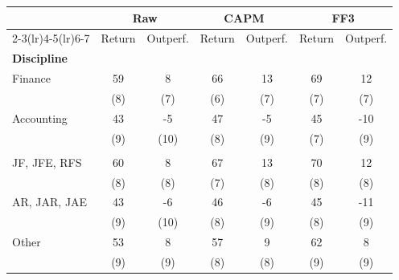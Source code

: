 \begin{tabular}{lcccccc}
   \toprule
   & \multicolumn{2}{c}{Raw} & \multicolumn{2}{c}{CAPM} & \multicolumn{2}{c}{FF3} \\
   \cmidrule(lr){2-3}\cmidrule(lr){4-5}\cmidrule(lr){6-7}
   & Return & Outperf. & Return & Outperf. & Return & Outperf. \\
   \midrule
   \multicolumn{7}{l}{\textbf{Discipline}} \\
   Finance & 59 & 8 & 66 & 13 & 69 & 12 \\
   & (8) & (7) & (6) & (7) & (7) & (7) \\
   Accounting & 43 & -5 & 47 & -5 & 45 & -10 \\
   & (9) & (10) & (8) & (9) & (7) & (9) \\
   \addlinespace
   \multicolumn{7}{l}{\textbf{Journal Rank}} \\
   JF, JFE, RFS & 60 & 8 & 67 & 13 & 70 & 12 \\
   & (8) & (8) & (7) & (8) & (8) & (8) \\
   AR, JAR, JAE & 43 & -6 & 46 & -6 & 45 & -11 \\
   & (9) & (10) & (8) & (9) & (8) & (9) \\
   Other & 53 & 8 & 57 & 9 & 62 & 8 \\
   & (9) & (9) & (8) & (8) & (9) & (9) \\
   \bottomrule
\end{tabular}
